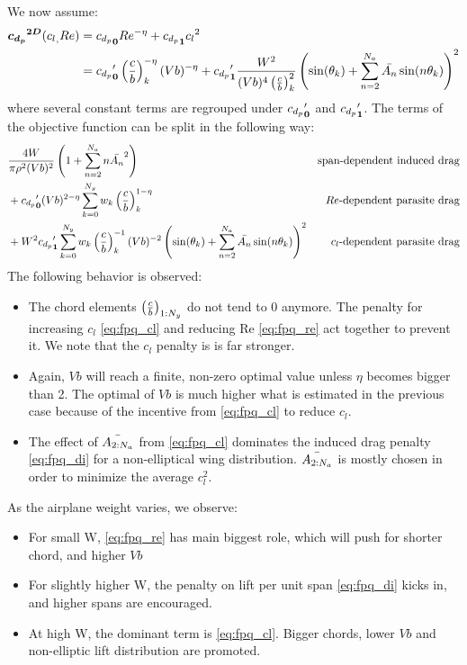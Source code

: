 \documentclass[letterpaper,12pt]{article}
\begin{document}
We now assume:
\begin{align}
	\label{eq:simple_model}
	\boldsymbol{{c_{d_p}}^{2D}}({c_l}_{\bf ,} Re) &= {c_{d_p}}_{\bf 0} Re^{-\eta} + {c_{d_p}}_{\bf 1} {c_l}_{\bf }^2  \\
	&= {c_{d_p}}_{\bf 0}'\left( \frac c b \right)_{k}^{-\eta}(Vb)^{-\eta}+ 
	{c_{d_p}}_{\bf 1}'\frac{W^2}{(Vb)^4\left( \frac c b \right)_{k}^2} \left(\sin(\theta_k) + \sum_{n=2}^{N_a} \bar{A_{n}} \sin(n \theta_k)\right)^2 
	\nonumber
\end{align}
where several constant terms are regrouped under ${c_{d_p}}_{\bf 0}'$ and ${c_{d_p}}_{\bf 1}'$.
The terms of the objective function can be split in the following way:
\begin{subequations}
	\begin{align}
		& \frac{4W}{\pi \rho^2 (Vb)^2} \left(1+\sum_{n=2}^{N_a} n \bar{A_{n}}^2\right) & {
			\text{span-dependent induced drag} 
		} \label{eq:fpq_di}&\\ 
		& + {{c_{d_p}}_{\bf 0}'(Vb)^{2-\eta} \sum_{k=0}^{N_y} w_k \left( \frac c b \right)_{k}^{1-\eta}} & {
			Re\text{-dependent parasite drag}
		} & \label{eq:fpq_re}\\
		& + W^2{{c_{d_p}}_{\bf 1}'\sum_{k=0}^{N_y} w_k \left( \frac c b \right)_{k}^{-1}(Vb)^{-2}
		\left(\sin(\theta_k) + \sum_{n=2}^{N_a} \bar{A_{n}} \sin(n \theta_k)\right)^2 } & {
			c_l\text{-dependent parasite drag}
		}& \label{eq:fpq_cl}
		\end{align}	
\end{subequations}
%
The following behavior is observed:
\begin{itemize}
	\item  The chord elements $\left( \frac c b \right)_{1:N_y}$ do not tend to 0 anymore. The penalty for increasing $c_l$ \ref{eq:fpq_cl} and reducing Re \ref{eq:fpq_re} act together to prevent it. We note that the $c_l$ penalty is is far stronger.
	\item Again, $Vb$ will reach a finite, non-zero optimal value unless $\eta$ becomes bigger than 2. The optimal of $Vb$ is much higher what is estimated in the previous case because of the incentive from \ref{eq:fpq_cl} to reduce $c_l$.
	\item The effect of $\bar{A_{2:N_a}}$ from \ref{eq:fpq_cl} dominates the induced drag penalty  \ref{eq:fpq_di} for a non-elliptical wing distribution.  $\bar{A_{2:N_a}}$ is mostly chosen in order to minimize the average $c_l^2$.
\end{itemize}
%
As the airplane weight varies, we observe:
\begin{itemize}
	\item For small W, \ref{eq:fpq_re} has main biggest role, which will push for shorter chord, and higher $Vb$
	\item For slightly higher W, the penalty on lift per unit span \ref{eq:fpq_di} kicks in, and higher spans are encouraged. 
	\item At high W, the dominant term is \ref{eq:fpq_cl}. Bigger chords, lower $Vb$ and non-elliptic lift distribution are promoted.
\end{itemize}
\end{document}
